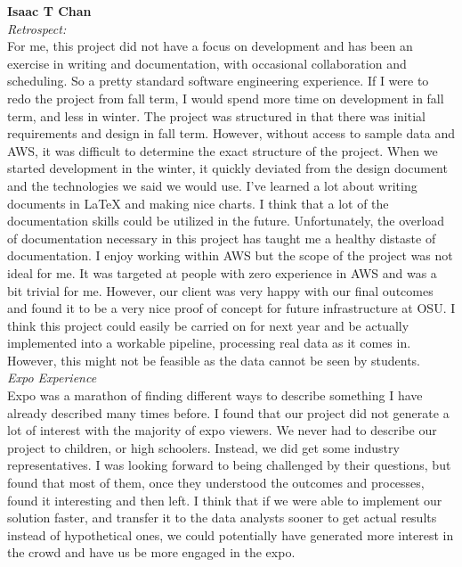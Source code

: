 \noindent\textbf{Isaac T Chan}\\
\noindent\textit{Retrospect:}\\
For me, this project did not have a focus on development and has been an exercise in writing and documentation, with occasional collaboration and scheduling. So a pretty standard software engineering experience. If I were to redo the project from fall term, I would spend more time on development in fall term, and less in winter. The project was structured in that there was initial requirements and design in fall term. However, without access to sample data and AWS, it was difficult to determine the exact structure of the project. When we started development in the winter, it quickly deviated from the design document and the technologies we said we would use. I've learned a lot about writing documents in LaTeX and making nice charts. I think that a lot of the documentation skills could be utilized in the future. Unfortunately, the overload of documentation necessary in this project has taught me a healthy distaste of documentation. I enjoy working within AWS but the scope of the project was not ideal for me. It was targeted at people with zero experience in AWS and was a bit trivial for me. However, our client was very happy with our final outcomes and found it to be a very nice proof of concept for future infrastructure at OSU. I think this project could easily be carried on for next year and be actually implemented into a workable pipeline, processing real data as it comes in. However, this might not be feasible as the data cannot be seen by students.\\

\noindent\textit{Expo Experience}\\
Expo was a marathon of finding different ways to describe something I have already described many times before. I found that our project did not generate a lot of interest with the majority of expo viewers. We never had to describe our project to children, or high schoolers. Instead, we did get some industry representatives. I was looking forward to being challenged by their questions, but found that most of them, once they understood the outcomes and processes, found it interesting and then left. I think that if we were able to implement our solution faster, and transfer it to the data analysts sooner to get actual results instead of hypothetical ones, we could potentially have generated more interest in the crowd and have us be more engaged in the expo.\\

